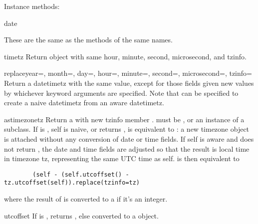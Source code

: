 Instance methods:

\begin{methoddesc}{date}{}

These are the same as the  methods of the same names.
\end{methoddesc}

\begin{methoddesc}{timetz}{}
    Return  object with same hour, minute, second, microsecond,
    and tzinfo.
\end{methoddesc}

\begin{methoddesc}{replace}{year=, month=, day=, hour=, minute=, second=, microsecond=,
            tzinfo=}
    Return a datetimetz with the same value, except for those fields given
    new values by whichever keyword arguments are specified.  Note that
     can be specified to create a naive datetimetz from
    an aware datetimetz.
\end{methoddesc}

\begin{methoddesc}{astimezone}{tz}
    Return a  with new tzinfo member .  
    must be , or an instance of a  subclass.  If
     is , self is naive, or
     returns ,
     is equivalent to
    :  a new timezone object is attached
    without any conversion of date or time fields.  If self is aware and
     does not return , the date and
    time fields are adjusted so that the result is local time in timezone
    tz, representing the same UTC time as self.  
    is then equivalent to
    \begin{verbatim}
        (self - (self.utcoffset() - tz.utcoffset(self)).replace(tzinfo=tz)
    \end{verbatim}
    where the result of  is converted to a
     if it's an integer.
\end{methoddesc}

\begin{methoddesc}{utcoffset}{}
    If  is , returns , else
     converted to a 
    object.
\end{methoddesc}

